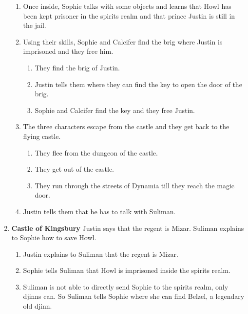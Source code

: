 \begin{enumerate}
\begin{enumerate}
  \item Once inside, Sophie talks with some objects and learns that Howl has been kept prisoner in the spirits realm and that prince Justin is still in the jail.
    
  \item Using their skills, Sophie and Calcifer find the brig where Justin is imprisoned and they free him.
    
  \begin{enumerate}
    \item They find the brig of Justin.
    
    \item Justin tells them where they can find the key to open the door of the brig.
	    
    \item Sophie and Calcifer find the key and they free Justin.
  \end{enumerate}
    
  \item The three characters escape from the castle and they get back to the flying castle.
    
  \begin{enumerate}
    \item They flee from the dungeon of the castle.
    
    \item They get out of the castle.
    
    \item They run through the streets of Dynamia till they reach the magic door.
  \end{enumerate}
    
  \item Justin tells them that he has to talk with Suliman.
  \end{enumerate}

\item \textbf{Castle of Kingsbury} Justin says that the regent is Mizar. Suliman explains to Sophie how to save Howl.

  \begin{enumerate}
    \item Justin explains to Suliman that the regent is Mizar.
    
    \item Sophie tells Suliman that Howl is imprisoned inside the spirits realm.
    
    \item Suliman is not able to directly send Sophie to the spirits realm, only djinns can. So Suliman tells Sophie where she can find Belzel, a legendary old djinn.
    

\end{enumerate}
\end{enumerate}
